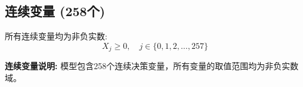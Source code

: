 \documentclass[a4paper,10pt]{article}
\begin{document}
\subsection{连续变量 (258个)}

所有连续变量均为非负实数:
\begin{equation}
X_j \geq 0, \quad j \in \{0, 1, 2, \ldots, 257\}
\end{equation}

\textbf{连续变量说明:} 模型包含258个连续决策变量，所有变量的取值范围均为非负实数域。
\end{document}

